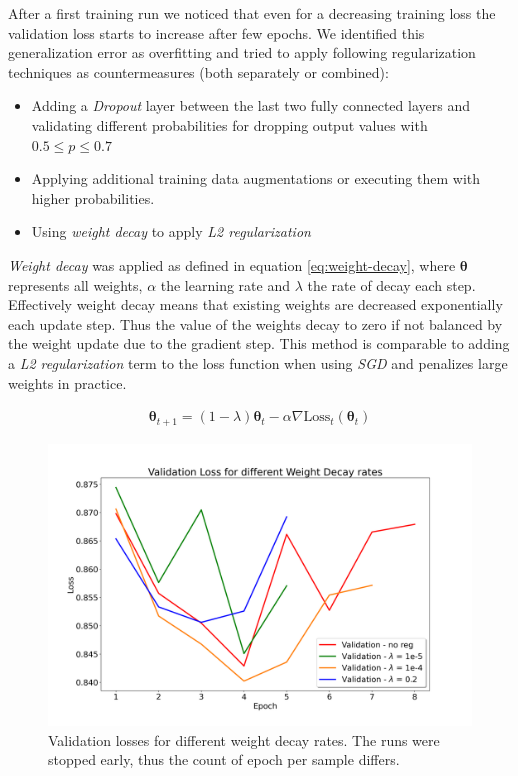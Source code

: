 After a first training run we noticed that even for a decreasing training loss the validation loss starts to increase after few epochs. We identified this generalization error as overfitting and tried to apply following regularization techniques as countermeasures (both separately or combined):
\begin{itemize} 
	\item Adding a \textit{Dropout} layer between the last two fully connected layers and validating different probabilities for dropping output values with $0.5 \leq p \leq 0.7$
	\item Applying additional training data augmentations or executing them with higher probabilities.
	\item Using \textit{weight decay} to apply \textit{L2 regularization}
\end{itemize}

\textit{Weight decay} was applied as defined in equation \ref{eq:weight-decay}, where $\boldsymbol{\theta}$ represents all weights, $\alpha$ the learning rate and $\lambda$ the rate of decay each step. Effectively weight decay means that existing weights are decreased exponentially each update step. Thus the value of the weights decay to zero if not balanced by the weight update due to the gradient step. This method is comparable to adding a \textit{L2 regularization} term to the loss function when using \textit{SGD} \autocite{loshchilov2017decoupled} and penalizes large weights in practice.

\begin{align}\label{eq:weight-decay}
	\boldsymbol{\theta}_{t+1} = \left( 1 - \lambda \right) \boldsymbol{\theta}_{t} - \alpha \nabla \text{Loss}_t \left( \boldsymbol{\theta}_{t} \right)
\end{align}

\begin{figure}[h!]
	\centering
	\includegraphics[width=.7\linewidth]{img/reg_study_weight_decay.png}
	\caption{Validation losses for different weight decay rates. The runs were stopped early, thus the count of epoch per sample differs.}
	\label{fig:weight-decay}
\end{figure}


